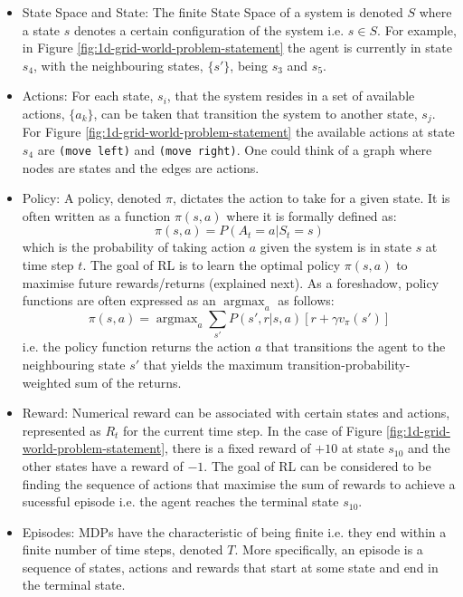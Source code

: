 \documentclass[a4paper,11pt]{article}
\DeclareMathOperator*{\argmax}{argmax}
\begin{document}
\begin{itemize}
    \item State Space and State: The finite State Space of a system is denoted $S$ where a state $s$ denotes a certain configuration of the system i.e. $s \in S$.  For example, in Figure \ref{fig:1d-grid-world-problem-statement} the agent is currently in state $s_4$, with the neighbouring states, $\{s'\}$, being $s_3$ and $s_5$.
    \item Actions: For each state, $s_i$, that the system resides in a set of available actions, $\{a_k\}$, can be taken that transition the system to another state, $s_j$.  For Figure \ref{fig:1d-grid-world-problem-statement} the available actions at state $s_4$ are \verb|(move left)| and \verb|(move right)|.  One could think of a graph where nodes are states and the edges are actions.
    \item Policy: A policy, denoted $\pi$, dictates the action to take for a given state.  It is often written as a function $\pi(s, a)$ where it is formally defined as:
    \begin{equation} \label{eqn:policy_formal_definition}
        \pi(s,a) = P(A_t=a|S_t=s)
    \end{equation}
    which is the probability of taking action $a$ given the system is in state $s$ at time step $t$. The goal of RL is to learn the optimal policy $\pi(s,a)$ to maximise future rewards/returns (explained next). As a foreshadow, policy functions are often expressed as an $\argmax_a$ as follows:
    \begin{equation} \label{eqn:value_iteration_foreshadow}
        \pi(s,a) = \argmax_a \sum_{s'} P(s',r|s,a)[r + \gamma v_{\pi}(s')]
    \end{equation}
    i.e. the policy function returns the action $a$ that transitions the agent to the neighbouring state $s'$ that yields the maximum transition-probability-weighted sum of the returns.
    \item Reward: Numerical reward can be associated with certain states and actions, represented as $R_t$ for the current time step.  In the case of Figure \ref{fig:1d-grid-world-problem-statement}, there is a fixed reward of $+10$ at state $s_{10}$ and the other states have a reward of $-1$.  The goal of RL can be considered to be finding the sequence of actions that maximise the sum of rewards to achieve a sucessful episode i.e. the agent reaches the terminal state $s_{10}$.
    \item Episodes:  MDPs have the characteristic of being finite i.e. they end within a finite number of time steps, denoted $T$.  More specifically, an episode is a sequence of states, actions and rewards that start at some state and end in the terminal state.

\end{itemize}
\end{document}
